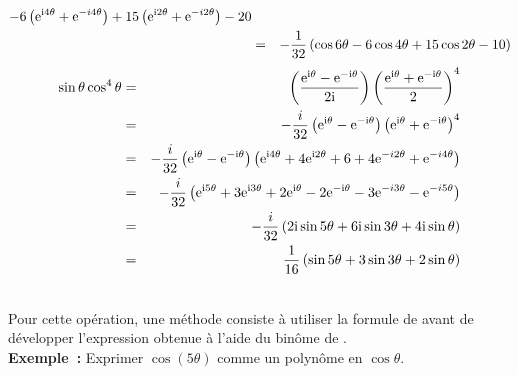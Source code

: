 \documentclass{magnolia}
\begin{document}
\begin{applications}
\begin{sol}
\begin{eqnarray*}
{                        -6\left({\rm e}^{{\rm i}4\theta}+{\rm e}^{-i4\theta}\right)
                        +15\left({\rm e}^{{\rm i}2\theta}+{\rm e}^{-i2\theta}\right)-20}\\
    &=& -\frac{1}{32}\left(\cos 6\theta-6\cos 4\theta+15\cos 2\theta-10\right)
    \end{eqnarray*}
    \begin{eqnarray*}
    \sin \theta \cos^4 \theta
    &=& \left(\frac{{\rm e}^{{\rm i}\theta}-{\rm e}^{-{\rm i}\theta}}{2{\rm i}}\right)
        \left(\frac{{\rm e}^{{\rm i}\theta}+{\rm e}^{-{\rm i}\theta}}{2}\right)^4\\
    &=& -\frac{i}{32}\left({\rm e}^{{\rm i}\theta}-{\rm e}^{-{\rm i}\theta}\right)
                     \left({\rm e}^{{\rm i}\theta}+{\rm e}^{-{\rm i}\theta}\right)^4\\
    &=& -\frac{i}{32}\left({\rm e}^{{\rm i}\theta}-{\rm e}^{-{\rm i}\theta}\right)
        \left({\rm e}^{{\rm i} 4\theta}+4{\rm e}^{{\rm i} 2\theta}+6+4{\rm e}^{-i2\theta}+{\rm e}^{-i4\theta}\right)\\
    &=& -\frac{i}{32}\left({\rm e}^{{\rm i} 5\theta}+3{\rm e}^{{\rm i} 3\theta}+2{\rm e}^{{\rm i}\theta}-2{\rm e}^{-{\rm i}\theta}
                        -3{\rm e}^{-i3\theta}-{\rm e}^{-i5\theta}\right)\\
    &=& -\frac{i}{32}\left(2{\rm i}\sin 5\theta+6{\rm i}\sin 3\theta+4{\rm i}\sin \theta\right)\\
    &=& \frac{1}{16}\left(\sin 5\theta+3\sin 3\theta+2\sin \theta\right)
    \end{eqnarray*}      
    \end{sol}
\\
  Pour cette opération, une méthode consiste à utiliser la formule de
   avant de développer l'expression obtenue à l'aide du binôme de
  .\\
  {\bf Exemple~:} Exprimer $\cos(5\theta)$ comme un polynôme en $\cos\theta$. 
\end{applications}
\end{document}
